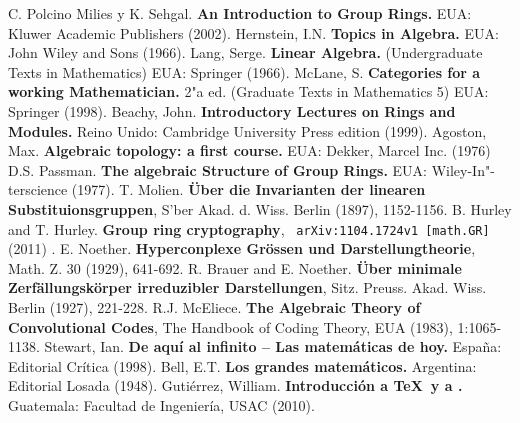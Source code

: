 \documentclass[12pt,letterpaper,titlepage]{article}
\begin{document}
\begin{thebibliography}{99}
 C. Polcino Milies y K. Sehgal. \textbf{An Introduction to Group Rings.} EUA: Kluwer Academic Publishers (2002).
 Hernstein, I.N. \textbf{Topics in Algebra.} EUA: John Wiley and Sons (1966).
 Lang, Serge. \textbf{Linear Algebra.} (Undergraduate Texts in Mathematics) EUA: Springer (1966).
 McLane, S. \textbf{Categories for a working Mathematician.} 2"a ed. (Graduate Texts in Mathematics 5) EUA: Springer (1998).
 Beachy, John. \textbf{Introductory Lectures on Rings and Modules.} Reino Unido: Cambridge University Press edition (1999).
 Agoston, Max. \textbf{Algebraic topology: a first course.} EUA: Dekker, Marcel Inc. (1976)
 D.S. Passman. \textbf{The algebraic Structure of Group Rings.} EUA: Wiley-In"-terscience (1977).
 T. Molien. \textbf{Über die Invarianten der linearen Substituionsgruppen}, S'ber Akad. d. Wiss. Berlin (1897), 1152-1156.
 B. Hurley and T. Hurley. \textbf{Group ring cryptography}, \texttt{	arXiv:1104.1724v1 [math.GR] } (2011) .
 E. Noether. \textbf{Hyperconplexe Grössen und Darstellungtheorie}, Math. Z. 30 (1929), 641-692.
 R. Brauer and E. Noether. \textbf{Über minimale Zerfällungskörper irreduzibler Darstellungen}, Sitz. Preuss. Akad. Wiss. Berlin (1927), 221-228.
 R.J. McEliece. \textbf{The Algebraic Theory of Convolutional Codes}, The Handbook of Coding Theory, EUA (1983), 1:1065-1138.
 Stewart, Ian. \textbf{De aquí al infinito -- Las matemáticas de hoy.} España: Editorial Crítica (1998).
 Bell, E.T. \textbf{Los grandes matemáticos.} Argentina: Editorial Losada (1948).
 Gutiérrez, William. \textbf{Introducción a \TeX\ y a \LaTeXe.} Guatemala: Facultad de Ingeniería, USAC (2010).
\end{thebibliography}

\label{fin}
\end{document}

